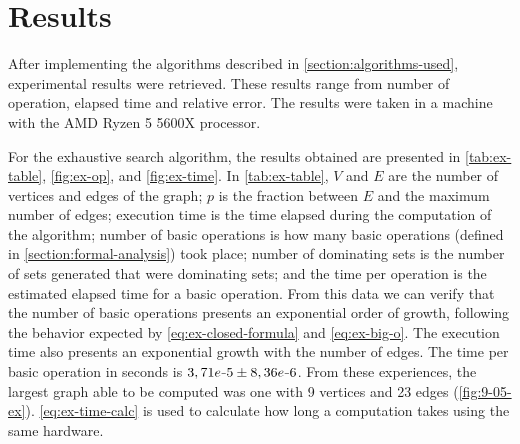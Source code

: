 \section{Results}\label{section:results}
After implementing the algorithms described in \autoref{section:algorithms-used}, experimental results were retrieved.
These results range from number of operation, elapsed time and relative error.
The results were taken in a machine with the AMD Ryzen 5 5600X processor.

For the exhaustive search algorithm, the results obtained are presented in \autoref{tab:ex-table}, \autoref{fig:ex-op}, and \autoref{fig:ex-time}.
In \autoref{tab:ex-table}, $V$ and $E$ are the number of vertices and edges of the graph; $p$ is the fraction between $E$ and the maximum number of edges; execution time is the time elapsed during the computation of the algorithm;
number of basic operations is how many basic operations (defined in \autoref{section:formal-analysis}) took place; number of dominating sets is the number of sets generated that were dominating sets; and the time per operation is the estimated elapsed time for a basic operation.
From this data we can verify that the number of basic operations presents an exponential order of growth, following the behavior expected by \autoref{eq:ex-closed-formula} and \autoref{eq:ex-big-o}.
The execution time also presents an exponential growth with the number of edges.
The time per basic operation in seconds is $3,71e\scalebox{0.5}[1.0]{\( - \)}5 \pm 8,36e{\scalebox{0.5}[1.0]{\( - \)}6}$.
From these experiences, the largest graph able to be computed was one with 9 vertices and 23 edges (\autoref{fig:9-05-ex}).
\autoref{eq:ex-time-calc} is used to calculate how long a computation takes using the same hardware.


